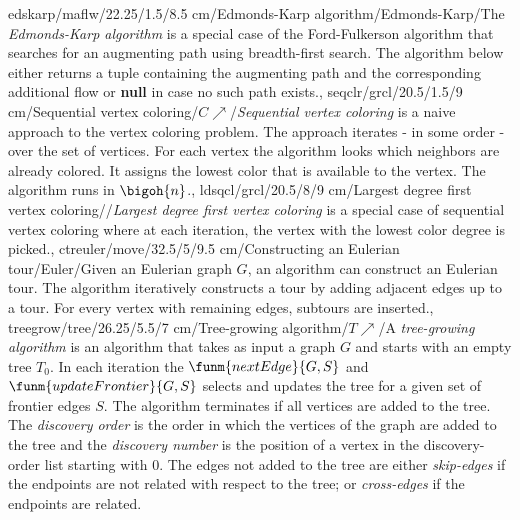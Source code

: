 edskarp/maflw/22.25/1.5/8.5 cm/{Edmonds-Karp algorithm}/{Edmonds-Karp}/{The \emph{Edmonds-Karp algorithm} is a special case of the Ford-Fulkerson algorithm that searches for an augmenting path using breadth-first search. The algorithm below either returns a tuple containing the augmenting path and the corresponding additional flow or \textbf{null} in case no such path exists.},
seqclr/grcl/20.5/1.5/9 cm/{Sequential vertex coloring}/{$C\nearrow$}/{\emph{Sequential vertex coloring} is a naive approach to the vertex coloring problem. The approach iterates - in some order - over the set of vertices. For each vertex the algorithm looks which neighbors are already colored. It assigns the lowest color that is available to the vertex. The algorithm runs in $\bigoh{n}$.},
ldsqcl/grcl/20.5/8/9 cm/{Largest degree first vertex coloring}/{}/{\emph{Largest degree first vertex coloring} is a special case of sequential vertex coloring where at each iteration, the vertex with the lowest color degree is picked.},
ctreuler/move/32.5/5/9.5 cm/{Constructing an Eulerian tour}/{Euler}/{Given an Eulerian graph $G$, an algorithm can construct an Eulerian tour. The algorithm iteratively constructs a tour by adding adjacent edges up to a tour. For every vertex with remaining edges, subtours are inserted.},
treegrow/tree/26.25/5.5/7 cm/{Tree-growing algorithm}/{$T\nearrow$}/{A \emph{tree-growing algorithm} is an algorithm that takes as input a graph $G$ and starts with an empty tree $T_0$. In each iteration the $\funm{nextEdge}{G,S}$ and $\funm{updateFrontier}{G,S}$ selects and updates the tree for a given set of frontier edges $S$. The algorithm terminates if all vertices are added to the tree. The \emph{discovery order} is the order in which the vertices of the graph are added to the tree and the \emph{discovery number} is the position of a vertex in the discovery-order list starting with $0$. The edges not added to the tree are either \emph{skip-edges} if the endpoints are not related with respect to the tree; or \emph{cross-edges} if the endpoints are related.}